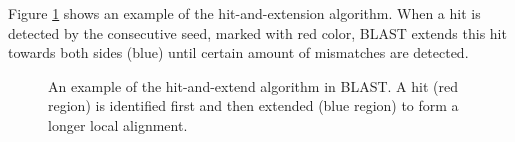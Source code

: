 Figure \ref{fig_BLAST} shows an example of the hit-and-extension algorithm. When a hit is detected by the consecutive seed, marked with red color, BLAST extends this hit towards both sides (blue) until certain amount of mismatches are detected. 
\\
\begin{figure}[h!]
\begin{center}
\setlength{\tabcolsep}{4.5pt}
\caption[An example of the hit-and-extend algorithm in BLAST]{An example of the hit-and-extend algorithm in BLAST. A hit (red region) is identified first and then extended (blue region) to form a longer local alignment.  \label{fig_BLAST}}
\end{center}
\end{figure}


